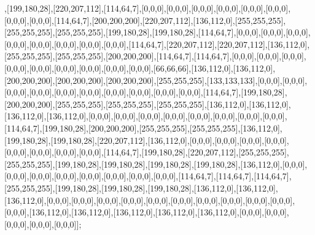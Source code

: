 ,[199,180,28],[220,207,112],[114,64,7],[0,0,0],[0,0,0],[0,0,0],[0,0,0],[0,0,0],[0,0,0],[0,0,0],[0,0,0],[114,64,7],[200,200,200],[220,207,112],[136,112,0],[255,255,255],[255,255,255],[255,255,255],[199,180,28],[199,180,28],[114,64,7],[0,0,0],[0,0,0],[0,0,0],[0,0,0],[0,0,0],[0,0,0],[0,0,0],[0,0,0],[114,64,7],[220,207,112],[220,207,112],[136,112,0],[255,255,255],[255,255,255],[200,200,200],[114,64,7],[114,64,7],[0,0,0],[0,0,0],[0,0,0],[0,0,0],[0,0,0],[0,0,0],[0,0,0],[0,0,0],[0,0,0],[66,66,66],[136,112,0],[136,112,0],[200,200,200],[200,200,200],[200,200,200],[255,255,255],[133,133,133],[0,0,0],[0,0,0],[0,0,0],[0,0,0],[0,0,0],[0,0,0],[0,0,0],[0,0,0],[0,0,0],[0,0,0],[114,64,7],[199,180,28],[200,200,200],[255,255,255],[255,255,255],[255,255,255],[136,112,0],[136,112,0],[136,112,0],[136,112,0],[0,0,0],[0,0,0],[0,0,0],[0,0,0],[0,0,0],[0,0,0],[0,0,0],[0,0,0],[114,64,7],[199,180,28],[200,200,200],[255,255,255],[255,255,255],[136,112,0],[199,180,28],[199,180,28],[220,207,112],[136,112,0],[0,0,0],[0,0,0],[0,0,0],[0,0,0],[0,0,0],[0,0,0],[0,0,0],[0,0,0],[114,64,7],[199,180,28],[220,207,112],[255,255,255],[255,255,255],[199,180,28],[199,180,28],[199,180,28],[199,180,28],[136,112,0],[0,0,0],[0,0,0],[0,0,0],[0,0,0],[0,0,0],[0,0,0],[0,0,0],[0,0,0],[114,64,7],[114,64,7],[114,64,7],[255,255,255],[199,180,28],[199,180,28],[199,180,28],[136,112,0],[136,112,0],[136,112,0],[0,0,0],[0,0,0],[0,0,0],[0,0,0],[0,0,0],[0,0,0],[0,0,0],[0,0,0],[0,0,0],[0,0,0],[0,0,0],[136,112,0],[136,112,0],[136,112,0],[136,112,0],[136,112,0],[0,0,0],[0,0,0],[0,0,0],[0,0,0],[0,0,0]];

